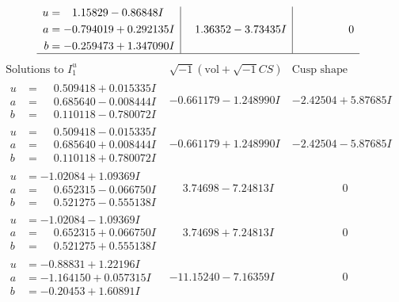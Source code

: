 \documentclass[1p]{elsarticle_modified}
\theoremstyle{definition}
\newcommand{\I}{\sqrt{-1}}
\begin{document}
$$\begin{array}{c|c|c}
\begin{aligned}
u &= \phantom{-}1.15829 - 0.86848 I \\
a &= -0.794019 + 0.292135 I \\
b &= -0.259473 + 1.347090 I\end{aligned}
 & \phantom{-}1.36352 - 3.73435 I & \phantom{-0.000000 } 0\\
 \hline 
 \end{array}$$\newpage$$\begin{array}{c|c|c}  
\text{Solutions to }I^u_{1}& \I (\text{vol} + \sqrt{-1}CS) & \text{Cusp shape}\\
 \hline 
\begin{aligned}
u &= \phantom{-}0.509418 + 0.015335 I \\
a &= \phantom{-}0.685640 - 0.008444 I \\
b &= \phantom{-}0.110118 - 0.780072 I\end{aligned}
 & -0.661179 - 1.248990 I & -2.42504 + 5.87685 I \\ \hline\begin{aligned}
u &= \phantom{-}0.509418 - 0.015335 I \\
a &= \phantom{-}0.685640 + 0.008444 I \\
b &= \phantom{-}0.110118 + 0.780072 I\end{aligned}
 & -0.661179 + 1.248990 I & -2.42504 - 5.87685 I \\ \hline\begin{aligned}
u &= -1.02084 + 1.09369 I \\
a &= \phantom{-}0.652315 - 0.066750 I \\
b &= \phantom{-}0.521275 - 0.555138 I\end{aligned}
 & \phantom{-}3.74698 - 7.24813 I & \phantom{-0.000000 } 0 \\ \hline\begin{aligned}
u &= -1.02084 - 1.09369 I \\
a &= \phantom{-}0.652315 + 0.066750 I \\
b &= \phantom{-}0.521275 + 0.555138 I\end{aligned}
 & \phantom{-}3.74698 + 7.24813 I & \phantom{-0.000000 } 0 \\ \hline\begin{aligned}
u &= -0.88831 + 1.22196 I \\
a &= -1.164150 + 0.057315 I \\
b &= -0.20453 + 1.60891 I\end{aligned}
 & -11.15240 - 7.16359 I & \phantom{-0.000000 } 0 \\ \hline\begin{aligned}

\end{aligned}
\end{array}$$
\end{document}
